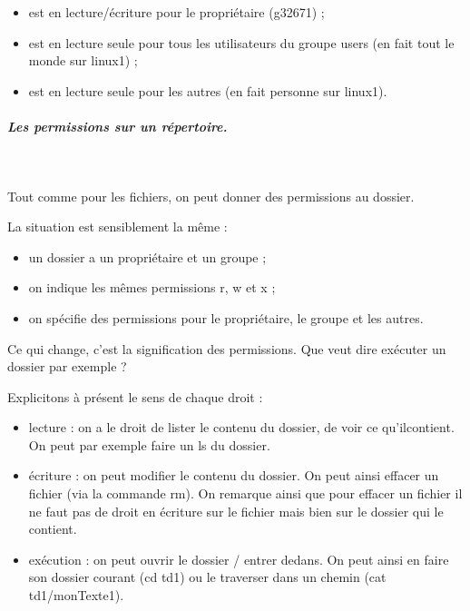 \documentclass[11pt,a4paper]{article}
\begin{document}
					\begin{itemize}
				
			\item est en lecture/\'ecriture pour le propri\'etaire (g32671) ; 
			\item est en lecture seule pour tous les utilisateurs du groupe users (en fait tout le monde sur linux1) ; 
			\item est en lecture seule pour les autres (en fait personne sur linux1).
					\end{itemize}
				
            \par
        
			
		\subparagraph{Les permissions sur un r\'epertoire.} 
		
					\textcolor{white}{.} \par
				
            \par
        
					Tout comme pour les fichiers, on peut donner des permissions au dossier.
        
            \par
        
					  La situation est sensiblement la m\^eme : 
					  
					\begin{itemize}
				
			\item un dossier a un propri\'etaire et un groupe ;
			\item on indique les m\^emes permissions r, w et x ;
			\item on sp\'ecifie des permissions pour le propri\'etaire, le groupe et les autres.
					\end{itemize}
				
            \par
        
          Ce qui change, c'est la signification des permissions. Que veut dire \guillemotleft  ex\'ecuter \guillemotright  un dossier par exemple ?
				
            \par
        
					Explicitons \`a pr\'esent le sens de chaque droit :
					 
					\begin{itemize}
				
			\item lecture : on a le droit de lister le contenu du dossier, de voir ce qu'ilcontient. On peut par exemple faire un ls du dossier.
			\item \'ecriture : on peut modifier le contenu du dossier. On peut ainsi effacer un fichier (via la commande rm).
					    On remarque ainsi que pour effacer un fichier il ne faut pas de droit en \'ecriture sur le fichier mais bien sur le dossier qui le contient.
			\item ex\'ecution : on peut \guillemotleft  ouvrir \guillemotright  le dossier / entrer dedans. 
					    On peut ainsi en faire son dossier courant (cd td1) ou le traverser dans un chemin (cat td1/monTexte1).
					\end{itemize}
				
\end{document}
